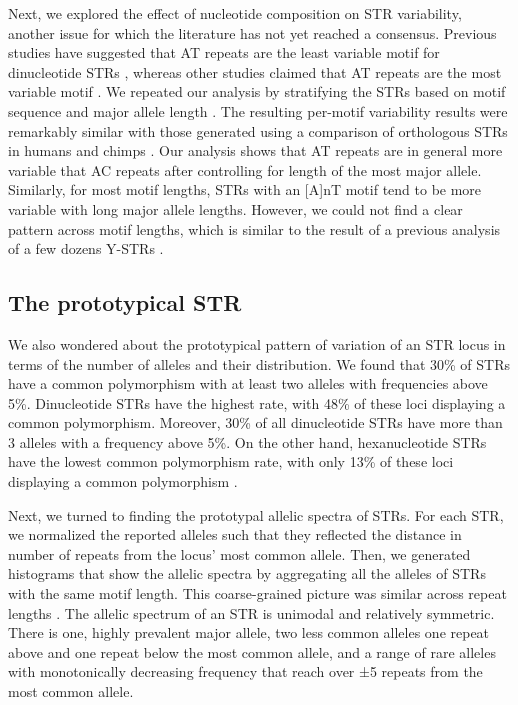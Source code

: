 Next, we explored the effect of nucleotide composition on STR variability, another issue for which the literature has not yet reached a consensus. Previous studies have suggested that AT repeats are the least variable motif for dinucleotide STRs \cite{PembertonSandefurJakobssonEtAl2009,BachtrogAgisImhofEtAl2000}, whereas other studies claimed that AT repeats are the most variable motif \cite{SunHelgasonMassonEtAl2012,KelkarTyekuchevaChiaromonteEtAl2008}. We repeated our analysis by stratifying the STRs based on motif sequence and major allele length \cite{SuppWillemsGymrekHighnamEtAl2014}. The resulting per-motif variability results were remarkably similar with those generated using a comparison of orthologous STRs in humans and chimps \cite{KelkarTyekuchevaChiaromonteEtAl2008}. Our analysis shows that AT repeats are in general more variable that AC repeats after controlling for length of the most major allele. Similarly, for most motif lengths, STRs with an [A]nT motif tend to be more variable with long major allele lengths. However, we could not find a clear pattern across motif lengths, which is similar to the result of a previous analysis of a few dozens Y-STRs \cite{BallantyneGoedbloedFangEtAl2010}. 

\subsection{The prototypical STR}
We also wondered about the prototypical pattern of variation of an STR locus in terms of the number of alleles and their distribution. We found that 30\% of STRs have a common polymorphism with at least two alleles with frequencies above 5\%. Dinucleotide STRs have the highest rate, with 48\% of these loci displaying a common polymorphism. Moreover, 30\% of all dinucleotide STRs have more than 3 alleles with a frequency above 5\%. On the other hand, hexanucleotide STRs have the lowest common polymorphism rate, with only 13\% of these loci displaying a common polymorphism \cite{SuppWillemsGymrekHighnamEtAl2014}.  

Next, we turned to finding the prototypal allelic spectra of STRs. For each STR, we normalized the reported alleles such that they reflected the distance in number of repeats from the locus' most common allele. Then, we generated histograms that show the allelic spectra by aggregating all the alleles of STRs with the same motif length. This coarse-grained picture was similar across repeat lengths \cite{SuppWillemsGymrekHighnamEtAl2014}.  The allelic spectrum of an STR is unimodal and relatively symmetric. There is one, highly prevalent major allele, two less common alleles one repeat above and one repeat below the most common allele, and a range of rare alleles with monotonically decreasing frequency that reach over ±5 repeats from the most common allele.  


